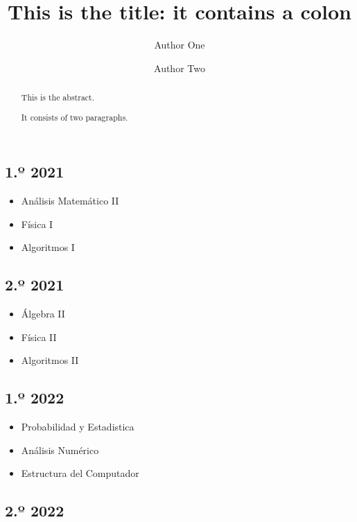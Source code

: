 \documentclass[
]{article}
\title{This is the title: it contains a colon}
\author{Author One \and Author Two}
\date{}
\providecommand{\tightlist}{%
  \setlength{\itemsep}{0pt}\setlength{\parskip}{0pt}}
\begin{document}
\maketitle
\begin{abstract}
This is the abstract.

It consists of two paragraphs.
\end{abstract}

{
\setcounter{tocdepth}{3}
\tableofcontents
}
\hypertarget{uxba-2021}{%
\subsection{1.º 2021}\label{uxba-2021}}

\begin{itemize}
\tightlist
\item
  Análisis Matemático II
\item
  Física I
\item
  Algoritmos I
\end{itemize}

\hypertarget{uxba-2021-1}{%
\subsection{2.º 2021}\label{uxba-2021-1}}

\begin{itemize}
\tightlist
\item
  Álgebra II
\item
  Física II
\item
  Algoritmos II
\end{itemize}

\hypertarget{uxba-2022}{%
\subsection{1.º 2022}\label{uxba-2022}}

\begin{itemize}
\tightlist
\item
  Probabilidad y Estadistica
\item
  Análisis Numérico
\item
  Estructura del Computador
\end{itemize}

\hypertarget{uxba-2022-1}{%
\subsection{2.º 2022}\label{uxba-2022-1}}
\end{document}
